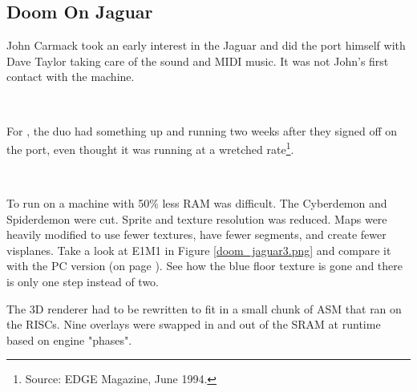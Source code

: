 \subsection{Doom On Jaguar}
John Carmack took an early interest in the Jaguar and did the port himself with Dave Taylor taking care of the sound and MIDI music. It was not John's first contact with the machine.\\
\par
{}\\
\par
For \doom, the duo had something up and running two weeks after they signed off on the port, even thought it was running at a wretched rate\footnote{Source: EDGE Magazine, June 1994.}.\\
\par
{}\\
\par
To run on a machine with 50\% less RAM was difficult. The Cyberdemon and Spiderdemon were cut. Sprite and texture resolution was reduced. Maps were heavily modified to use fewer textures, have fewer segments, and create fewer visplanes. Take a look at E1M1 in Figure \ref{doom_jaguar3.png} and compare it with the PC version (on page \pageref{mashed_potatoes1.png}). See how the blue floor texture is gone and there is only one step instead of two.\\
\par
The 3D renderer had to be rewritten to fit in a small chunk of ASM that ran on the RISCs. Nine overlays were swapped in and out of the SRAM at runtime based on engine "phases".\\
\par
{}
\par
